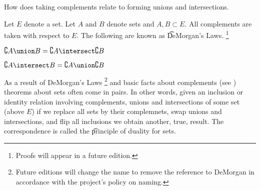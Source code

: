 

How does taking complements relate to forming unions and intersections.


Let $E$ denote a set.
Let $A$ and $B$ denote sets and $A, B \subset E$.
All complements are taken with respect to $E$.
The following are known as \t{DeMorgan's Laws}.
  \ifhmode\unskip\fi\footnote{
Proofs will appear in a future edition.
  }

\begin{proposition}
$\complement{A \union B} = \complement{A} \intersect \complement{B}$
\end{proposition}

\begin{proposition}
$\complement{A \intersect B} = \complement{A} \union \complement{B}$
\end{proposition}


As a result of DeMorgan's Laws
  \ifhmode\unskip\fi\footnote{
Future editions will change the name to remove the reference to DeMorgan in accordance with the project's policy on naming.
  }
and basic facts about complements (see ) theorems about sets often come in pairs.
In other words, given an inclusion or identity relation involving complements, unions and intersections of some set (above $E$) if we replace all sets by their complemnets, swap unions and intersections, and flip all inclusions we obtain another, true, result.
The correspondence is called the \t{principle of duality for sets}.

\blankpage
